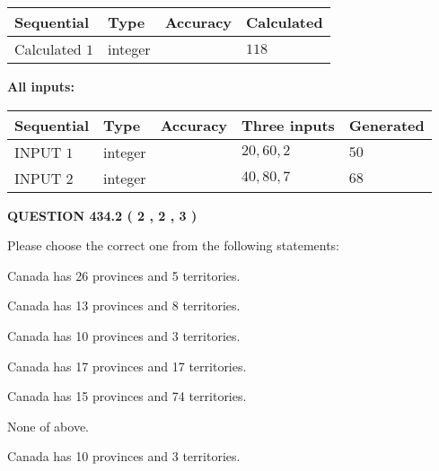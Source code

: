 \documentclass[12pt]{article}
\begin{document}
   
  
  
\noindent\begin{tabular}{|l|l|l|l|}
\hline
 Sequential & Type & Accuracy & Calculated \\ 
\hline
 
 
  Calculated $  1 $ & integer &  & 
  $ 118 $ 
 \\  \hline  
 \end{tabular}
   
   
   
   
\noindent\vspace{0.1in}\hspace{-0.08in} {\textbf{\Large{All inputs: }}}
   
   
  
  
\noindent\begin{tabular}{|l|l|l|l|l|}
\hline
 Sequential & Type & Accuracy & Three inputs & Generated \\ 
\hline
 
 
  INPUT $  1 $ & integer &  & $
 20
 , 
 60
 , 
 2
 $ & $ 50 $ 
 \\  \hline  
 
 
  INPUT $  2 $ & integer &  & $
 40
 , 
 80
 , 
 7
 $ & $ 68 $ 
 \\  \hline  
 \end{tabular}
   
   
  
\vspace{0.2in}
  
{\textbf{\Large{QUESTION
434.2 
 ( 2 , 2 , 3 )
}}}
  
  
Please choose the correct one from the following statements:
 
 
Canada has  26 provinces and  5 territories.
 
 
Canada has  13 provinces and  8 territories.
 
 
Canada has 10  provinces and 3 territories.
 
 
Canada has  17 provinces and  17 territories.
 
 
Canada has  15 provinces and  74 territories.
 
 
 None of above.
 
 
\noindent{}
 
 
Canada has 10  provinces and 3 territories.
 
\end{document}

